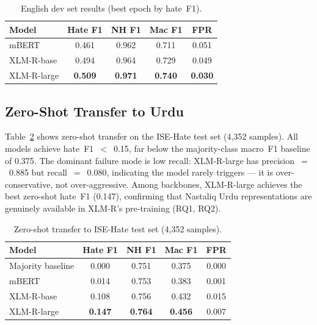 \documentclass{article}
\begin{document}
\begin{table}[h]
\centering
\caption{English dev set results (best epoch by hate~F1).}
\label{tab:en_results}
\vskip 0.05in
\begin{small}
\begin{tabular}{lcccc}
\toprule
Model & Hate F1 & NH F1 & Mac F1 & FPR \\
\midrule
mBERT          & 0.461 & 0.962 & 0.711 & 0.051 \\
XLM-R-base     & 0.494 & 0.964 & 0.729 & 0.049 \\
XLM-R-large    & \textbf{0.509} & \textbf{0.971} & \textbf{0.740} & \textbf{0.030} \\
\bottomrule
\end{tabular}
\end{small}
\end{table}

\subsection{Zero-Shot Transfer to Urdu}
\label{sec:zero-shot}

Table~\ref{tab:zs_results} shows zero-shot transfer on the ISE-Hate test
set (4{,}352 samples).
All models achieve hate~F1~$<$~0.15, far below the majority-class
macro~F1 baseline of 0.375.
The dominant failure mode is low recall: XLM-R-large has
precision~$=$~0.885 but recall~$=$~0.080, indicating the model rarely
triggers --- it is over-conservative, not over-aggressive.
Among backbones, XLM-R-large achieves the best zero-shot hate~F1
(0.147), confirming that Nastaliq Urdu representations are genuinely
available in XLM-R's pre-training (RQ1, RQ2).

\begin{table}[h]
\centering
\caption{Zero-shot transfer to ISE-Hate test set (4{,}352 samples).}
\label{tab:zs_results}
\vskip 0.05in
\begin{small}
\begin{tabular}{lcccc}
\toprule
Model & Hate F1 & NH F1 & Mac F1 & FPR \\
\midrule
Majority baseline   & 0.000 & 0.751 & 0.375 & 0.000 \\
mBERT               & 0.014 & 0.753 & 0.383 & 0.001 \\
XLM-R-base          & 0.108 & 0.756 & 0.432 & 0.015 \\
XLM-R-large         & \textbf{0.147} & \textbf{0.764} & \textbf{0.456} & 0.007 \\
\bottomrule
\end{tabular}
\end{small}
\end{table}
\end{document}
